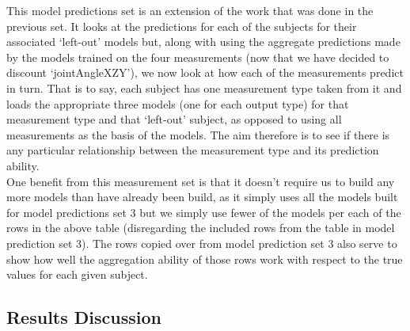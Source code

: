 \documentclass[12pt,twoside]{report}
\begin{document}
\quad This model predictions set is an extension of the work that was done in the previous set. It looks at the predictions for each of the subjects for their associated ‘left-out’ models but, along with using the aggregate predictions made by the models trained on the four measurements (now that we have decided to discount ‘jointAngleXZY’), we now look at how each of the measurements predict in turn. That is to say, each subject has one measurement type taken from it and loads the appropriate three models (one for each output type) for that measurement type and that ‘left-out’ subject, as opposed to using all measurements as the basis of the models. The aim therefore is to see if there is any particular relationship between the measurement type and its prediction ability.\\

\quad One benefit from this measurement set is that it doesn’t require us to build any more models than have already been build, as it simply uses all the models built for model predictions set 3 but we simply use fewer of the models per each of the rows in the above table (disregarding the included rows from the table in model prediction set 3). The rows copied over from model prediction set 3 also serve to show how well the aggregation ability of those rows work with respect to the true values for each given subject.

\subsection{Results Discussion}
\end{document}
